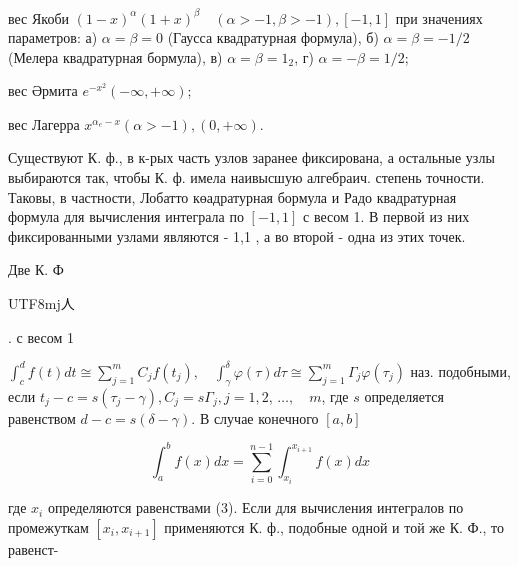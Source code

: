 \documentclass[10pt]{article}
\begin{document}
вес Якоби $(1-x)^{\alpha}(1+x)^{\beta} \quad(\alpha>-1, \beta>-1),[-1,1]$ при значениях параметров: а) $\alpha=\beta=0$ (Гаусса квадратурная формула), б) $\alpha=\beta=-1 / 2$ (Мелера квадратурная бормула), в) $\alpha=\beta=1{ }_{2}$, г) $\alpha=-\beta=1 / 2$;



вес Әрмита $e^{-x^{2}}(-\infty,+\infty)$;



вес Лагерра $x^{\alpha_{e}-x}(\alpha>-1),(0,+\infty)$.



Существуют К. ф., в к-рых часть узлов заранее фиксирована, а остальные узлы выбираются так, чтобы К. ф. имела наивысшую алгебраич. степень точности. Таковы, в частности, Лобатто көадратурная бормула и Радо квадратурная формула для вычисления интеграла по $[-1,1]$ с весом 1. В первой из них фиксированными узлами являются - 1,1 , а во второй - одна из этих точек.



Две К. Ф\begin{CJK}{UTF8}{mj}人\end{CJK}. с весом 1



$\int_{c}^{d} f(t) d t \cong \sum_{j=1}^{m} C_{j} f\left(t_{j}\right), \quad \int_{\gamma}^{\delta} \varphi(\tau) d \tau \cong \sum_{j=1}^{m} \Gamma_{j} \varphi\left(\tau_{j}\right)$ наз. подобными, если $t_{j}-c=s\left(\tau_{j}-\gamma\right), C_{j}=s \Gamma_{j}, j=1,2$, $\ldots, \quad m$, где $s$ определяется равенством $d-c=s(\delta-\gamma)$. В случае конечного $[a, b]$



\[

\int_{a}^{b} f(x) d x=\sum_{i=0}^{n-1} \int_{x_{i}}^{x_{i+1}} f(x) d x

\]



где $x_{i}$ определяются равенствами (3). Если для вычисления интегралов по промежуткам $\left[x_{i}, x_{i+1}\right]$ применяются К. ф., подобные одной и той же К. Ф., то равенст-
\end{document}
